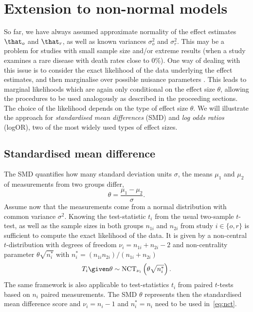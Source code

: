 \section{Extension to non-normal models} \label{sec:tdist}
So far, we have always assumed approximate normality of the effect estimates
$\that_o$ and $\that_r$, as well as known variances $\sigma^2_o$ and
$\sigma^2_r$. This may be a problem for studies with small sample size and/or
extreme results (\eg when a study examines a rare disease with death rates close
to 0\%). One way of dealing with this issue is to consider the exact likelihood
of the data underlying the effect estimates, and then marginalise over possible
nuisance parameters \citep[Chapter 8.2.2]{Spiegelhalter2004}. This leads to
marginal likelihoods which are again only conditional on the effect size
$\theta$, allowing the procedures to be used analogously as described in the
proceeding sections. The choice of the likelihood depends on the type of effect
size $\theta$. We will illustrate the approach for \emph{standardised mean
differences} (SMD) and \emph{log odds ratios} (logOR), two of the most widely
used types of effect sizes.

\subsection{Standardised mean difference}
The SMD quantifies how many standard deviation units $\sigma$, the means $\mu_1$
and $\mu_2$ of measurements from two groups differ, \ie
$$\theta = \frac{\mu_1 - \mu_2}{\sigma}.$$
Assume now that the measurements come from a normal distribution with common
variance $\sigma^2$. Knowing the test-statistic $t_i$ from the usual two-sample
$t$-test, as well as the sample sizes in both groups $n_{1i}$ and $n_{2i}$ from
study $i \in \{o, r\}$ is sufficient to compute the exact likelihood of the
data. It is given by a non-central $t$-distribution with degrees of freedom
$\nu_i = n_{1i} + n_{2i} - 2$ and non-centrality parameter $\theta \sqrt{n^*_i}$
with $n^*_i = (n_{1i}n_{2i})/(n_{1i} + n_{2i})$ \citep{Bayarri2002}
\begin{align}
  \label{eq:nct}
  T_i \given \theta \sim \text{NCT}_{\nu_i} \left(\theta \sqrt{n^*_i}\right).
\end{align}
The same framework is also applicable to test-statistics $t_{i}$ from paired
$t$-tests based on $n_{i}$ paired measurements. The SMD $\theta$ represents then
the standardised mean difference score and $\nu_{i} = n_{i} - 1$ and
$n_{i}^{*} = n_{i}$ need to be used in~\eqref{eq:nct}.


